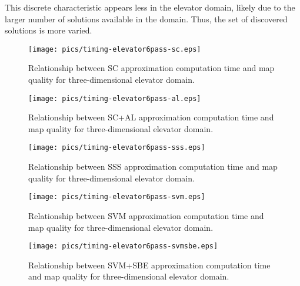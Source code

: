 This discrete characteristic appears less in the elevator domain, likely due to the larger number of solutions available in the domain.  Thus, the set of discovered solutions  is more varied.

\begin{figure}
\begin{center}
\texttt{[image: pics/timing-elevator6pass-sc.eps]}
\caption{Relationship between SC approximation computation time and map quality for three-dimensional elevator domain.}
\label{fig:timing-elevator6pass-sc}
\end{center}
\end{figure}

\begin{figure}
\begin{center}
\texttt{[image: pics/timing-elevator6pass-al.eps]}
\caption{Relationship between SC+AL approximation computation time and map quality for three-dimensional elevator domain.}
\label{fig:timing-elevator6pass-al}
\end{center}
\end{figure}

\begin{figure}
\begin{center}
\texttt{[image: pics/timing-elevator6pass-sss.eps]}
\caption{Relationship between SSS approximation computation time and map quality for three-dimensional elevator domain.}
\label{fig:timing-elevator6pass-sss}
\end{center}
\end{figure}

\begin{figure}
\begin{center}
\texttt{[image: pics/timing-elevator6pass-svm.eps]}
\caption{Relationship between SVM approximation computation time and map quality for three-dimensional elevator domain.}
\label{fig:timing-elevator6pass-svm}
\end{center}
\end{figure}

\begin{figure}
\begin{center}
\texttt{[image: pics/timing-elevator6pass-svmsbe.eps]}
\caption{Relationship between SVM+SBE approximation computation time and map quality for three-dimensional elevator domain.}
\label{fig:timing-elevator6pass-svmsbe}
\end{center}
\end{figure}

